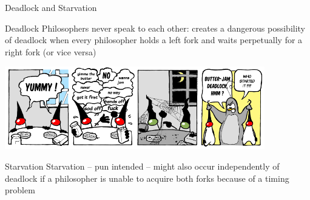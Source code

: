 \begin{frame}{Deadlock and Starvation}
  \begin{block}{Deadlock}
    Philosophers never speak to each other: creates a dangerous
    possibility of deadlock when every philosopher holds a left fork
    and waits perpetually for a right fork (or vice versa)
  \end{block}

  \begin{center}
    \includegraphics[width=0.85\textwidth]{figures/butter-jam-deadlock}
  \end{center}

  \begin{block}{Starvation}
    Starvation -- pun intended -- might also occur independently of
    deadlock if a philosopher is unable to acquire both forks because
    of a timing problem
  \end{block}
\end{frame}

